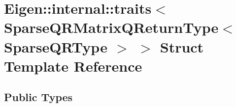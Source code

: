 \hypertarget{struct_eigen_1_1internal_1_1traits_3_01_sparse_q_r_matrix_q_return_type_3_01_sparse_q_r_type_01_4_01_4}{}\section{Eigen\+:\+:internal\+:\+:traits$<$ Sparse\+Q\+R\+Matrix\+Q\+Return\+Type$<$ Sparse\+Q\+R\+Type $>$ $>$ Struct Template Reference}
\label{struct_eigen_1_1internal_1_1traits_3_01_sparse_q_r_matrix_q_return_type_3_01_sparse_q_r_type_01_4_01_4}
\subsection*{Public Types}
